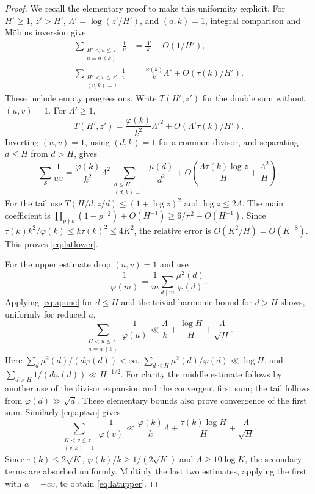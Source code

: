 \documentclass[10pt,reqno]{amsart}
\theoremstyle{remark}
\newcommand{\Sset}{\mathcal S}
\begin{document}
\begin{proof}
We recall the elementary proof to make this uniformity explicit.  For
$H'\geq1$, $z'>H'$, $\Lambda'=\log(z'/H')$, and $(a,k)=1$, integral
comparison and M\"obius inversion give
\begin{align}
 \sum_{\substack{H'<u\leq z'\\u\equiv a\ (k)}}\frac1u
 &=\frac{\Lambda'}k+O(1/H'),\label{eq:apone}\\
 \sum_{\substack{H'<v\leq z'\\(v,k)=1}}\frac1v
 &=\frac{\varphi(k)}k\Lambda'+O(\tau(k)/H').\label{eq:aptwo}
\end{align}
These include empty progressions.  Write $T(H',z')$ for the double sum
without $(u,v)=1$.  For $\Lambda'\geq1$,
\[
 T(H',z')=\frac{\varphi(k)}{k^2}\Lambda'^2
              +O(\Lambda'\tau(k)/H').
\]
Inverting $(u,v)=1$, using $(d,k)=1$ for a common divisor, and separating
$d\leq H$ from $d>H$, gives
\[
 \sum_{\Sset}\frac1{uv}
 =\frac{\varphi(k)}{k^2}\Lambda^2
       \sum_{\substack{d\leq H\\(d,k)=1}}\frac{\mu(d)}{d^2}
 +O\left(\frac{\Lambda\tau(k)\log z}{H}+\frac{\Lambda^2}{H}\right).
\]
For the tail use $T(H/d,z/d)\leq(1+\log z)^2$ and
$\log z\leq2\Lambda$.  The main coefficient is
$\prod_{p\nmid k}(1-p^{-2})+O(H^{-1})\geq6/\pi^2-O(H^{-1})$.
Since $\tau(k)k^2/\varphi(k)\leq k\tau(k)^2\leq4K^2$, the relative
error is $O(K^2/H)=O(K^{-8})$.  This proves \eqref{eq:latlower}.

For the upper estimate drop $(u,v)=1$ and use
\[
 \frac1{\varphi(m)}=\frac1m\sum_{d\mid m}\frac{\mu^2(d)}{\varphi(d)}.
\]
Applying \eqref{eq:apone} for $d\leq H$ and the trivial harmonic bound
for $d>H$ shows, uniformly for reduced $a$,
\[
 \sum_{\substack{H<u\leq z\\u\equiv a\ (k)}}\frac1{\varphi(u)}
 \ll\frac\Lambda k+\frac{\log H}{H}+\frac\Lambda{\sqrt H}.
\]
Here $\sum_d\mu^2(d)/(d\varphi(d))<\infty$,
$\sum_{d\leq H}\mu^2(d)/\varphi(d)\ll\log H$, and
$\sum_{d>H}1/(d\varphi(d))\ll H^{-1/2}$.
For clarity the middle estimate follows by another use of the divisor
expansion and the convergent first sum; the tail follows from
$\varphi(d)\gg\sqrt d$.  These elementary bounds also prove convergence
of the first sum.  Similarly \eqref{eq:aptwo} gives
\[
 \sum_{\substack{H<v\leq z\\(v,k)=1}}\frac1{\varphi(v)}
 \ll\frac{\varphi(k)}k\Lambda+
        \frac{\tau(k)\log H}{H}+\frac\Lambda{\sqrt H}.
\]
Since $\tau(k)\leq2\sqrt K$, $\varphi(k)/k\geq1/(2\sqrt K)$ and
$\Lambda\geq10\log K$, the secondary terms are absorbed uniformly.
Multiply the last two estimates, applying the first with $a=-cv$, to
obtain \eqref{eq:latupper}.
\end{proof}
\end{document}
